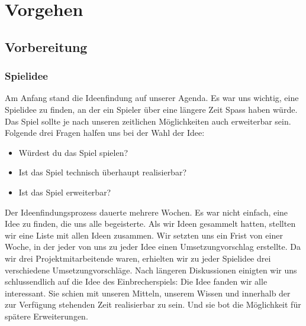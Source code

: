\documentclass[11pt,a4paper]{scrbook}
\begin{document}
\chapter{Vorgehen}
\section{Vorbereitung}
\subsection{Spielidee}
Am Anfang stand die Ideenfindung auf unserer Agenda. 
Es war uns wichtig, eine Spielidee zu finden, an der ein Spieler über eine längere Zeit Spass haben würde.
Das Spiel sollte je nach unseren zeitlichen Möglichkeiten auch erweiterbar sein.
Folgende drei Fragen halfen uns bei der Wahl der Idee:
\begin{itemize}
\item Würdest du das Spiel spielen?
\item Ist das Spiel technisch überhaupt realisierbar?
\item Ist das Spiel erweiterbar?
\end{itemize}
Der Ideenfindungsprozess dauerte mehrere Wochen. Es war nicht einfach, eine Idee zu finden, die uns alle begeisterte.
Als wir Ideen gesammelt hatten, stellten wir eine Liste mit allen Ideen zusammen.
Wir setzten uns ein Frist von einer Woche, in der jeder von uns zu jeder Idee einen Umsetzungvorschlag erstellte.
Da wir drei Projektmitarbeitende waren, erhielten wir zu jeder Spielidee drei verschiedene Umsetzungvorschläge.
Nach längeren Diskussionen einigten wir uns schlussendlich auf die Idee des Einbrecherspiels:
Die Idee fanden wir alle interessant. Sie schien mit unseren Mitteln, unserem Wissen und innerhalb der zur Verfügung stehenden Zeit realisierbar zu sein. Und sie bot die Möglichkeit für spätere Erweiterungen.
\end{document}
